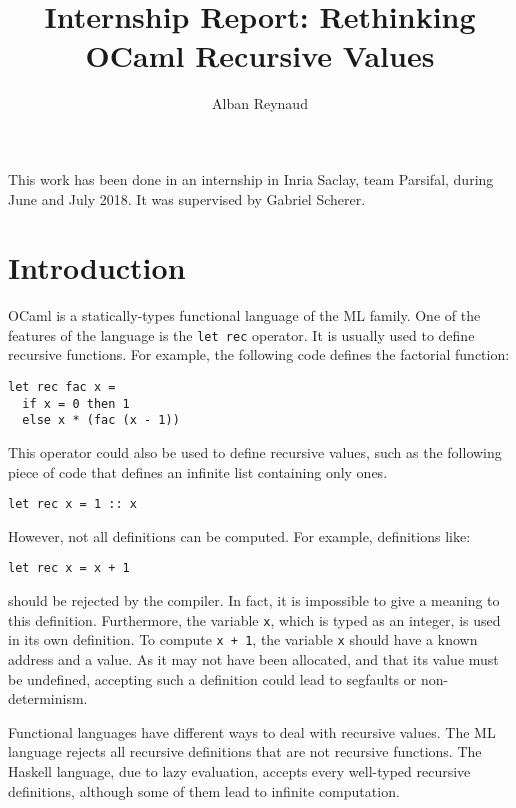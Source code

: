 \documentclass{article}
\title{Internship Report: Rethinking OCaml Recursive Values}
\author{Alban Reynaud}
\date{}
\begin{document}
\maketitle

This work has been done in an internship in Inria Saclay, team Parsifal, during
June and July 2018. It was supervised by Gabriel Scherer.

\section{Introduction}
OCaml is a statically-types functional language of the ML family. One of the
features of the language is the \lstinline|let rec| operator. It is usually
used to define recursive functions. For example, the following code defines the
factorial function:

\begin{lstlisting}
let rec fac x =
  if x = 0 then 1
  else x * (fac (x - 1))
\end{lstlisting}

This operator could also be used to define recursive values, such as the
following piece of code that defines an infinite list containing only ones.
\begin{lstlisting}
let rec x = 1 :: x
\end{lstlisting}

However, not all definitions can be computed. For example, definitions like:
\begin{lstlisting}
let rec x = x + 1
\end{lstlisting}
should be rejected by the compiler. In fact, it is impossible to give a meaning
to this definition. Furthermore, the variable \lstinline|x|, which is typed as
an integer, is used in its own definition. To compute \lstinline|x + 1|, the
variable \lstinline|x| should have a known address and a value. As it may not
have been allocated, and that its value must be undefined, accepting such a
definition could lead to segfaults or non-determinism.

Functional languages have different ways to deal with recursive values. The
ML language rejects all recursive definitions that are not recursive functions.
The Haskell language, due to lazy evaluation, accepts every well-typed recursive
definitions, although some of them lead to infinite computation.
\end{document}
